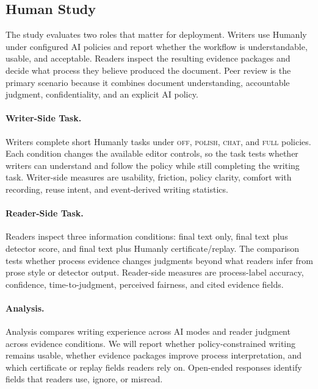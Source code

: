 \documentclass[11pt]{article}
\begin{document}
\subsection{Human Study}
\label{sec:study}

The study evaluates two roles that matter for deployment. Writers use Humanly under configured AI policies and report whether the workflow is understandable, usable, and acceptable. Readers inspect the resulting evidence packages and decide what process they believe produced the document. Peer review is the primary scenario because it combines document understanding, accountable judgment, confidentiality, and an explicit AI policy.

\paragraph{Writer-Side Task.}
Writers complete short Humanly tasks under \textsc{off}, \textsc{polish}, \textsc{chat}, and \textsc{full} policies. Each condition changes the available editor controls, so the task tests whether writers can understand and follow the policy while still completing the writing task. Writer-side measures are usability, friction, policy clarity, comfort with recording, reuse intent, and event-derived writing statistics.

\paragraph{Reader-Side Task.}
Readers inspect three information conditions: final text only, final text plus detector score, and final text plus Humanly certificate/replay. The comparison tests whether process evidence changes judgments beyond what readers infer from prose style or detector output. Reader-side measures are process-label accuracy, confidence, time-to-judgment, perceived fairness, and cited evidence fields.

\paragraph{Analysis.}
Analysis compares writing experience across AI modes and reader judgment across evidence conditions. We will report whether policy-constrained writing remains usable, whether evidence packages improve process interpretation, and which certificate or replay fields readers rely on. Open-ended responses identify fields that readers use, ignore, or misread.
\end{document}
